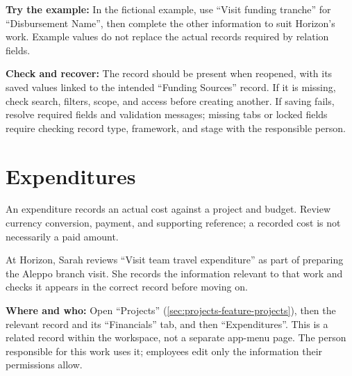 \textbf{Try the example:} In the fictional example, use “Visit funding tranche” for “Disbursement Name”, then complete the other information to suit Horizon's work. Example values do not replace the actual records required by relation fields.

\textbf{Check and recover:} The record should be present when reopened, with its saved values linked to the intended “Funding Sources” record. If it is missing, check search, filters, scope, and access before creating another. If saving fails, resolve required fields and validation messages; missing tabs or locked fields require checking record type, framework, and stage with the responsible person.

\clearpage
\section{Expenditures}
\label{sec:projects-feature-expenditures}

An expenditure records an actual cost against a project and budget. Review currency conversion, payment, and supporting reference; a recorded cost is not necessarily a paid amount.

\begin{rcnote}
At Horizon, Sarah reviews “Visit team travel expenditure” as part of preparing the Aleppo branch visit. She records the information relevant to that work and checks it appears in the correct record before moving on.
\end{rcnote}

\textbf{Where and who:} Open “Projects” (\ref{sec:projects-feature-projects}), then the relevant record and its “Financials” tab, and then “Expenditures”. This is a related record within the workspace, not a separate app-menu page. The person responsible for this work uses it; employees edit only the information their permissions allow.

